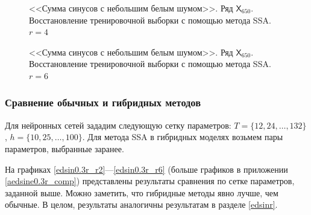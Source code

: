 \documentclass[specialist,
               substylefile = spbu.rtx,
               subf,href,colorlinks=true, 12p]{disser}
\newcommand{\multiref}[2]{\ref{#1}---\ref{#2}}
\begin{document}
\begin{figure}[H]
	\captionsetup{justification=centering}
	\caption{<<Сумма синусов с небольшим белым шумом>>. Ряд $\mathsf{X}_{650}$. Восстановление тренировочной выборки с помощью метода SSA. $r = 4$}
	\label{edsin0.3r_rec4}
\end{figure}

\begin{figure}[H]
	\captionsetup{justification=centering}
	\caption{<<Сумма синусов с небольшим белым шумом>>. Ряд $\mathsf{X}_{650}$. Восстановление тренировочной выборки с помощью метода SSA. $r = 6$}
	\label{edsin0.3r_rec6}
\end{figure}

\subsubsection{Сравнение обычных и гибридных методов}
\label{edsine0.3r_comp}

Для нейронных сетей зададим следующую сетку параметров: $T = \{12, 24, \ldots, 132 \}$, $h = \{10, 25, \ldots, 100 \}$. Для метода SSA в гибридных моделях возьмем пары параметров, выбранные заранее.

На графиках \multiref{edsin0.3r_r2}{edsin0.3r_r6} (больше графиков в приложении \ref{aedsine0.3r_comp}) представлены результаты сравнения по сетке параметров, заданной выше. Можно заметить, что гибридные методы явно лучше, чем обычные. В целом, результаты аналогичны результатам в разделе \ref{edsinr}.
\end{document}
